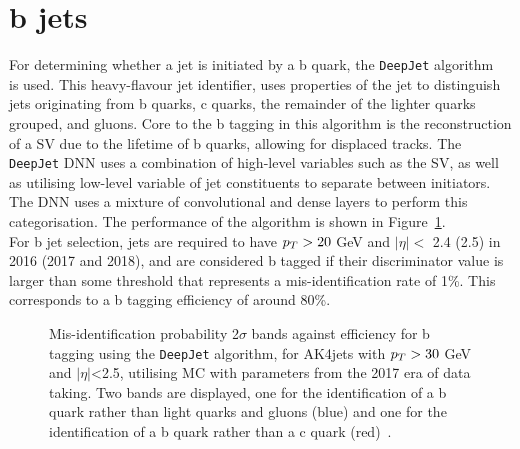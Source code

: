 \section{b jets}

For determining whether a jet is initiated by a b quark, the \texttt{DeepJet} algorithm~\cite{CMS:2017wtu,Bols:2020bkb} is used.  
This heavy-flavour jet identifier, uses properties of the jet to distinguish jets originating from b quarks, c quarks, the remainder of the lighter quarks grouped, and gluons.
Core to the b tagging in this algorithm is the reconstruction of a \ac{SV} due to the lifetime of b quarks, allowing for displaced tracks.
The \texttt{DeepJet} \ac{DNN} uses a combination of high-level variables such as the \ac{SV}, as well as utilising low-level variable of jet constituents to separate between initiators.
The \ac{DNN} uses a mixture of convolutional and dense layers to perform this categorisation.
The performance of the algorithm is shown in Figure~\ref{fig:deepjet}. \\

For b jet selection, jets are required to have $p_{T} > 20$ GeV and $|\eta| <$ 2.4 (2.5) in 2016 (2017 and 2018), and are considered b tagged if their discriminator value is larger than some threshold that represents a mis-identification rate of 1\%.
This corresponds to a b tagging efficiency of around 80\%.

\begin{figure}[!hbtp]
\centering
\caption{Mis-identification probability 2$\sigma$ bands against efficiency for b tagging using the \texttt{DeepJet} algorithm, for AK4jets with $p_{T}>30$ GeV and $|\eta|$<2.5, utilising MC with parameters from the 2017 era of data taking. Two bands are displayed, one for the identification of a b quark rather than light quarks and gluons (blue) and one for the identification of a b quark rather than a c quark (red)~\cite{deepjet}.}
\label{fig:deepjet}
\end{figure}

